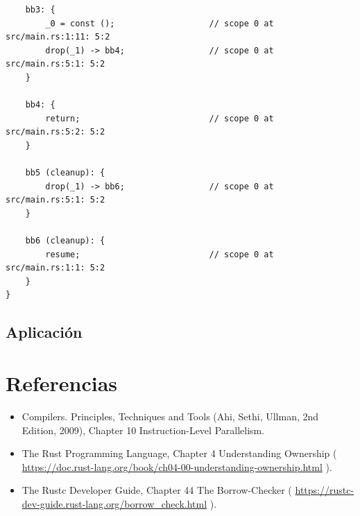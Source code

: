\documentclass[12pt, a4paper]{article}
\begin{document}
\begin{verbatim}
    bb3: {
        _0 = const ();                   // scope 0 at src/main.rs:1:11: 5:2
        drop(_1) -> bb4;                 // scope 0 at src/main.rs:5:1: 5:2
    }

    bb4: {
        return;                          // scope 0 at src/main.rs:5:2: 5:2
    }

    bb5 (cleanup): {
        drop(_1) -> bb6;                 // scope 0 at src/main.rs:5:1: 5:2
    }

    bb6 (cleanup): {
        resume;                          // scope 0 at src/main.rs:1:1: 5:2
    }
}
\end{verbatim}


\subsection{Aplicación}

\section{Referencias}

\begin{itemize}
\item Compilers. Principles, Techniques and Tools (Ahi, Sethi, Ullman, 2nd Edition, 2009), Chapter 10 Instruction-Level Parallelism.
\item The Rust Programming Language, Chapter 4 Understanding Ownership 
      ( \url{https://doc.rust-lang.org/book/ch04-00-understanding-ownership.html} ). 
\item The Rustc Developer Guide, Chapter 44 The Borrow-Checker 
      ( \url{https://rustc-dev-guide.rust-lang.org/borrow_check.html} ). 
\end{itemize}
\end{document}

